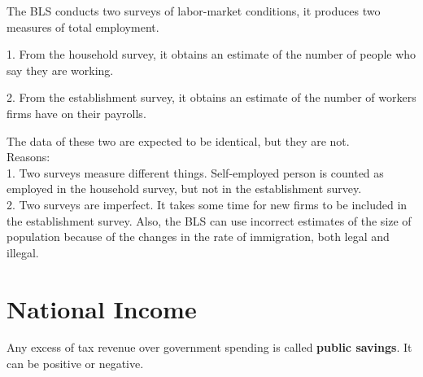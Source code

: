 \documentclass[12pt]{article}
\begin{document}
The BLS conducts two surveys of labor-market conditions, it produces two measures of 
total employment. 

1. From the household survey, it obtains an estimate of the number of people who say they
are working. 

2. From the establishment survey, it obtains an estimate of the number of workers firms 
have on their payrolls.


The data of these two are expected to be identical, but they are not.\\
Reasons:\\
1. Two surveys measure different things. Self-employed person is counted as employed in 
the household survey, but not in the establishment survey.\\
2. Two surveys are imperfect. It takes some time for new firms to be included in the
establishment survey. Also, the BLS can use incorrect estimates of the size of population
because of the changes in the rate of immigration, both legal and illegal.







\section{National Income}


\begin{figure}[H]
\end{figure}

Any excess of tax revenue over government spending is called {\textbf {public savings}}.
It can be positive or negative.
\end{document}
